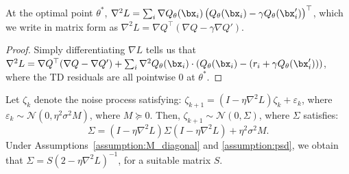\begin{lemma}
At the optimal point $\theta^*$, $\nabla^2 L = \sum_i \nabla Q_\theta(\bx_i) \left(Q_\theta(\bx_i) - \gamma Q_\theta(\bx'_i)\right)^\top$, which we write in matrix form as $\nabla^2 L = \nabla Q^\top (\nabla Q - \gamma \nabla Q')$.
\end{lemma}
\begin{proof}
Simply differentiating $\nabla L$ tells us that $\nabla^2 L = \nabla Q^\top (\nabla Q - \nabla Q') + \sum_i \nabla^2 Q_\theta(\bx_i) \cdot ( Q_\theta(\bx_i) - (r_i + \gamma Q_\theta(\bx'_i)))$, where the TD residuals are all pointwise $0$ at $\theta^*$.
\end{proof}

\begin{lemma}
\label{eqn:covariance_noise}
Let $\zeta_{k}$ denote the noise process satisfying: $\zeta_{k+1} = (I - \eta \nabla^2 L) \zeta_k + \varepsilon_k$, where $\varepsilon_k \sim \mathcal{N}(0, \eta^2 \sigma^2 M)$, where $M \succcurlyeq 0$. Then, $\zeta_{k+1} \sim \mathcal{N}(0, \Sigma)$, where $\Sigma$ satisfies: 
\begin{equation*}
    \Sigma = (I - \eta \nabla^2 L) \Sigma (I - \eta \nabla^2 L) + \eta^2 \sigma^2 M.
\end{equation*}
Under Assumptions~\ref{assumption:M_diagonal} and \ref{assumption:psd}, we obtain that $\Sigma = S (2 - \eta \nabla^2 L)^{-1}$, for a suitable matrix $S$.
\end{lemma}
